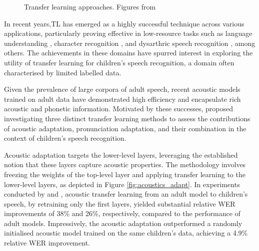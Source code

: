 \begin{figure}[t]
\centering
{}
\caption{Transfer learning approaches. Figures from \cite{TFchildren}}
\end{figure}
In recent years,\ac{TL} has emerged as a highly successful technique across various applications, particularly proving effective in low-resource tasks such as language understanding \cite{Bert}, character recognition \cite{tfcharacter}, and dysarthric speech recognition \cite{tfpathology}, among others. The achievements in these domains have spurred interest in exploring the utility of transfer learning for children's speech recognition, a domain often characterised by limited labelled data.

Given the prevalence of large corpora of adult speech, recent acoustic models trained on adult data have demonstrated high efficiency and encapsulate rich acoustic and phonetic information. Motivated by these successes, \cite{TFchildren} proposed investigating three distinct transfer learning methods to assess the contributions of acoustic adaptation, pronunciation adaptation, and their combination in the context of children's speech recognition.

Acoustic adaptation targets the lower-level layers, leveraging the established notion that these layers capture acoustic properties. The methodology involves freezing the weights of the top-level layer and applying transfer learning to the lower-level layers, as depicted in Figure \ref{fig:acoustics_adapt}. In experiments conducted by \cite{TFchildren} and \cite{TransferLF}, acoustic transfer learning from an adult model to children's speech, by retraining only the first layers, yielded substantial relative \ac{WER} improvements of 38\% and 26\%, respectively, compared to the performance of adult models. Impressively, the acoustic adaptation outperformed a randomly initialised acoustic model trained on the same children's data, achieving a 4.9\% relative \ac{WER} improvement.

